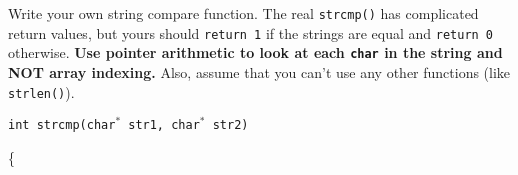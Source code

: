 \documentclass[12pt]{exam}
\begin{document}
\begin{questions}
\question
Write your own string compare function.
The real {\tt strcmp()} has complicated return values, but yours should {\tt return 1} if the strings are equal and {\tt return 0} otherwise.
{\bf Use pointer arithmetic to look at each {\tt char} in the string and NOT array indexing.}
Also, assume that you can't use any other functions (like {\tt strlen()}).

{\tt int strcmp(char$^*$ str1, char$^*$ str2)

\{ }

\end{questions}
\end{document}
